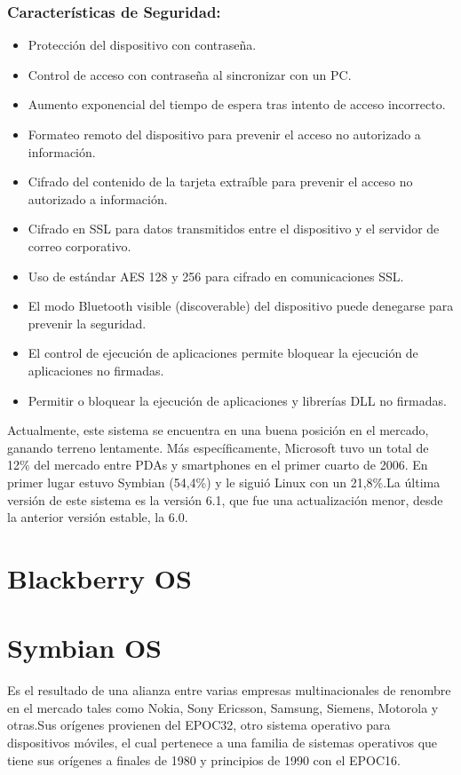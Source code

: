 \subsubsection*{Características de Seguridad:}
\begin{itemize}
	\item Protección del dispositivo con contraseña.
	\item Control de acceso con contraseña al sincronizar con un PC.
	\item Aumento exponencial del tiempo de espera tras intento de acceso incorrecto.
	\item Formateo remoto del dispositivo para prevenir el acceso no autorizado a información.
	\item Cifrado del contenido de la tarjeta extraíble para prevenir el acceso no autorizado a información.
	\item Cifrado en SSL para datos transmitidos entre el dispositivo y el servidor de correo corporativo.
	\item Uso de estándar AES 128 y 256 para cifrado en comunicaciones SSL.
	\item El modo Bluetooth visible (discoverable) del dispositivo puede denegarse para prevenir la seguridad.
	\item El control de ejecución de aplicaciones permite bloquear la ejecución de aplicaciones no firmadas.
	\item Permitir o bloquear la ejecución de aplicaciones y librerías DLL no firmadas.   
\end{itemize}
Actualmente, este sistema se encuentra en una buena posición en el mercado, ganando terreno lentamente. Más específicamente, Microsoft tuvo un total de 12\% del mercado entre PDAs y smartphones en el primer cuarto de 2006. En primer lugar estuvo Symbian (54,4\%) y le siguió Linux con un 21,8\%.La última versión de este sistema es la versión 6.1, que fue una actualización menor, desde la anterior versión estable, la 6.0.

\section*{Blackberry OS}

\section*{Symbian OS}
Es el resultado de una alianza entre varias empresas multinacionales de renombre en el mercado tales como Nokia, Sony Ericsson, Samsung, Siemens, Motorola y otras.Sus orígenes provienen del EPOC32, otro sistema operativo para dispositivos móviles, el cual pertenece a una familia de sistemas operativos que tiene sus orígenes a finales de 1980 y principios de 1990 con el EPOC16.

